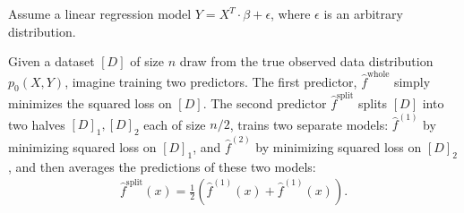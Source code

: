 \documentclass[11pt]{article}
\begin{document}
Assume a linear regression model $Y = X^T \cdot \beta + \epsilon$, where $\epsilon$ is an arbitrary distribution.

Given a dataset $[D]$ of size $n$ draw from the true observed data distribution $p_0(X, Y)$, imagine training two predictors.
The first predictor, $\hat{f}^{\text{whole}}$ simply minimizes the squared loss on $[D]$.
The second predictor $\hat{f}^{\text{split}}$ splits $[D]$ into two halves $[D]_1, [D]_2$ each of size $n/2$, trains two separate models:  $\hat{f}^{(1)}$ by minimizing squared loss on $[D]_1$, and $\hat{f}^{(2)}$ by minimizing squared loss on $[D]_2$, and then averages the predictions of these two models: 
\begin{align*}
\hat{f}^{\text{split}}(x) = \frac{1}{2} \left( \hat{f}^{(1)}(x) + \hat{f}^{(1)}(x) \right).
\end{align*}
\end{document}
